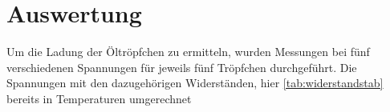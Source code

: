 \section{Auswertung}

Um die Ladung der Öltröpfchen zu ermitteln, wurden Messungen bei fünf verschiedenen Spannungen für jeweils fünf Tröpfchen durchgeführt.
Die Spannungen mit den dazugehörigen Widerständen, hier \autoref{tab:widerstandstab} bereits in Temperaturen umgerechnet
